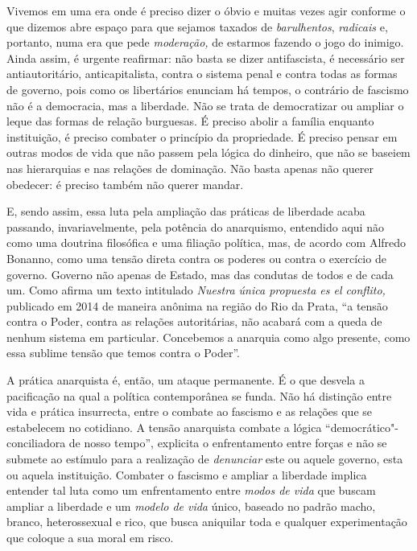 Vivemos em uma era onde é preciso dizer o óbvio e muitas vezes agir
conforme o que dizemos abre espaço para que sejamos taxados de
\emph{barulhentos}, \emph{radicais} e, portanto, numa era que pede
\emph{moderação,} de estarmos fazendo o jogo do inimigo. Ainda assim, é
urgente reafirmar: não basta se dizer antifascista, é necessário ser
antiautoritário, anticapitalista, contra o sistema penal e contra todas
as formas de governo, pois como os libertários enunciam há tempos, o
contrário de fascismo não é a democracia, mas a liberdade. Não se trata
de democratizar ou ampliar o leque das formas de relação burguesas. É
preciso abolir a família enquanto instituição, é preciso combater o
princípio da propriedade. É preciso pensar em outras modos de vida que
não passem pela lógica do dinheiro, que não se baseiem nas hierarquias e
nas relações de dominação. Não basta apenas não querer obedecer: é
preciso também não querer mandar.

E, sendo assim, essa luta pela ampliação das práticas de liberdade acaba
passando, invariavelmente, pela potência do anarquismo, entendido aqui
não como uma doutrina filosófica e uma filiação política, mas, de acordo
com Alfredo Bonanno, como uma tensão direta contra os poderes ou contra
o exercício de governo. Governo não apenas de Estado, mas das condutas
de todos e de cada um. Como afirma um texto intitulado \emph{Nuestra
única propuesta es el conflito,} publicado em 2014 de maneira anônima na
região do Rio da Prata, ``a tensão contra o Poder, contra as relações
autoritárias, não acabará com a queda de nenhum sistema em particular.
Concebemos a anarquia como algo presente, como essa sublime tensão que
temos contra o Poder''.

A prática anarquista é, então, um ataque permanente. É o que desvela a
pacificação na qual a política contemporânea se funda. Não há distinção
entre vida e prática insurrecta, entre o combate ao fascismo e as
relações que se estabelecem no cotidiano. A tensão anarquista combate a
lógica ``democrático"-conciliadora de nosso tempo'', explicita o
enfrentamento entre forças e não se submete ao estímulo para a
realização de \emph{denunciar} este ou aquele governo, esta ou aquela
instituição. Combater o fascismo e ampliar a liberdade implica
entender tal luta como um enfrentamento entre \emph{modos de vida} que
buscam ampliar a liberdade e um \emph{modelo de vida} único, baseado no
padrão macho, branco, heterossexual e rico, que busca aniquilar toda e
qualquer experimentação que coloque a sua moral em risco.

